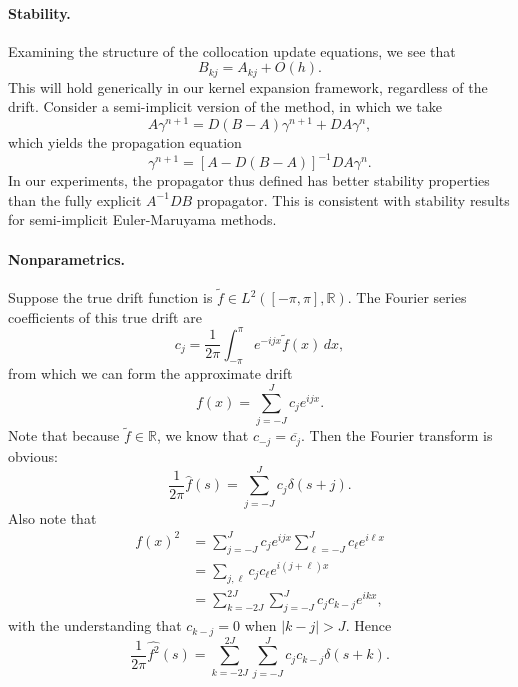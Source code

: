 \documentclass[11pt,letterpaper]{article}
\begin{document}
\paragraph{Stability.} Examining the structure of the collocation update equations, we see that
\[
B_{kj} = A_{kj} + O(h).
\]
This will hold generically in our kernel expansion framework, regardless of the drift.  Consider a semi-implicit version of the method, in which we take
\[
A \gamma^{n+1} = D (B - A) \gamma^{n+1} + D A \gamma^n,
\]
which yields the propagation equation
\[
\gamma^{n+1} = \left[ A - D(B-A) \right]^{-1} D A \gamma^n.
\]
In our experiments, the propagator thus defined has better stability properties than the fully explicit $A^{-1} D B$ propagator. This is consistent with stability results for semi-implicit Euler-Maruyama methods.

\paragraph{Nonparametrics.} Suppose the true drift function is $\widetilde{f} \in L^2([-\pi,\pi],\mathbb{R})$.  The Fourier series coefficients of this true drift are
\[
c_j = \frac{1}{2 \pi} \int_{-\pi}^{\pi} e^{-i j x} \widetilde{f}(x) \, dx,
\]
from which we can form the approximate drift
\[
f(x) = \sum_{j=-J}^J c_j e^{i j x}.
\]
Note that because $\tilde{f} \in \mathbb{R}$, we know that $c_{-j} = \overline{c_j}$. Then the Fourier transform is obvious:
\[
\frac{1}{2 \pi} \widehat{f}(s) = \sum_{j=-J}^J c_j \delta(s + j).
\]
Also note that
\begin{align*}
f(x)^2 &= \sum_{j=-J}^J c_j e^{i j x} \sum_{\ell=-J}^J c_{\ell} e^{i \ell x} \\
 &= \sum_{j,\ell} c_j c_{\ell} e^{i (j + \ell) x} \\
 &= \sum_{k=-2J}^{2J} \sum_{j=-J}^J c_j c_{k-j} e^{i k x},
\end{align*}
with the understanding that $c_{k-j} = 0$ when $|k-j| > J$.  Hence
\[
\frac{1}{2 \pi} \widehat{f^2} (s) = \sum_{k=-2J}^{2J} \sum_{j=-J}^J c_j c_{k-j}  \delta(s + k).
\]
\end{document}
